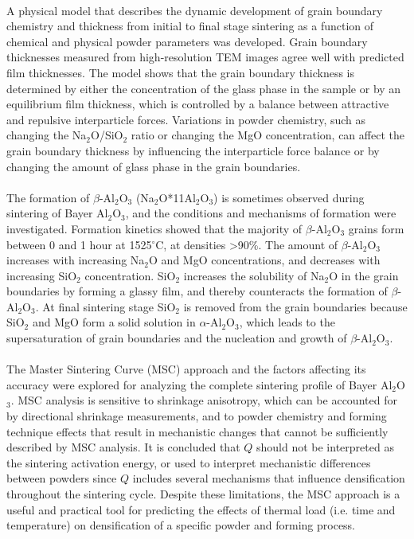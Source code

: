 \paragraph*{} A physical model that describes the dynamic development of grain boundary chemistry and thickness from initial to final stage sintering as a function of chemical and physical powder parameters was developed. Grain boundary thicknesses measured from high-resolution TEM images agree well with predicted film thicknesses. The model shows that the grain boundary thickness is determined by either the concentration of the glass phase in the sample or by an equilibrium film thickness, which is controlled by a balance between attractive and repulsive interparticle forces. Variations in powder chemistry, such as changing the Na$_{2}$O/SiO$_{2}$ ratio or changing the MgO concentration, can affect the grain boundary thickness by influencing the interparticle force balance or by changing the amount of glass phase in the grain boundaries. 
\paragraph*{} The formation of $\beta$-Al$_{2}$O$_{3}$ (Na$_{2}$O*11Al$_{2}$O$_{3}$) is sometimes observed during sintering of Bayer Al$_{2}$O$_{3}$, and the conditions and mechanisms of formation were investigated. Formation kinetics showed that the majority of $\beta$-Al$_{2}$O$_{3}$ grains form between 0 and 1 hour at 1525$^{\circ}$C, at densities >90\%. The amount of $\beta$-Al$_{2}$O$_{3}$ increases with increasing Na$_{2}$O and MgO concentrations, and decreases with increasing SiO$_{2}$ concentration. SiO$_{2}$ increases the solubility of Na$_{2}$O in the grain boundaries by forming a glassy film, and thereby counteracts the formation of $\beta$-Al$_{2}$O$_{3}$. At final sintering stage SiO$_{2}$ is removed from the grain boundaries because SiO$_{2}$ and MgO form a solid solution in $\alpha$-Al$_{2}$O$_{3}$, which leads to the supersaturation of grain boundaries and the nucleation and growth of $\beta$-Al$_{2}$O$_{3}$.
\paragraph*{} The Master Sintering Curve (MSC) approach and the factors affecting its accuracy were explored for analyzing the complete sintering profile of Bayer Al$_{2}$O$_{3}$. MSC analysis is sensitive to shrinkage anisotropy, which can be accounted for by directional shrinkage measurements, and to powder chemistry and forming technique effects that result in mechanistic changes that cannot be sufficiently described by MSC analysis. It is concluded that $Q$ should not be interpreted as the sintering activation energy, or used to interpret mechanistic differences between powders since $Q$ includes several mechanisms that influence densification throughout the sintering cycle. Despite these limitations, the MSC approach is a useful and practical tool for predicting the effects of thermal load (i.e. time and temperature) on densification of a specific powder and forming process. 